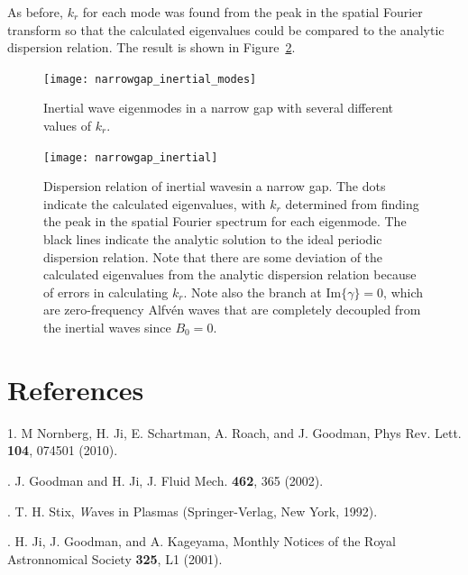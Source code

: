 \documentclass[letterpaper]{article}
\begin{document}
As before, $k_r$ for each mode was found from the peak in the spatial
Fourier transform so that the calculated eigenvalues could be compared
to the analytic dispersion relation. The result is shown in
Figure~\ref{fig:globalcode:narrowgap_inertial}.

\begin{figure}
\centering
\texttt{[image: narrowgap\_inertial\_modes]}
\caption[Inertial wave eigenmodes in a narrow gap]{Inertial wave
  eigenmodes in a narrow gap with several different values of
  $k_r$.}
\label{fig:globalcode:narrowgap_inertial_modes}
\end{figure}


\begin{figure}
\centering
\texttt{[image: narrowgap\_inertial]}
\caption[Dispersion relation of inertial wavesgap]{Dispersion relation
  of inertial wavesin a narrow gap. The dots indicate the calculated
  eigenvalues, with $k_r$ determined from finding the peak in the
  spatial Fourier spectrum for each eigenmode. The black lines
  indicate the analytic solution to the ideal periodic dispersion
  relation. Note that there are some deviation of the calculated
  eigenvalues from the analytic dispersion relation because of errors
  in calculating $k_r$. Note also the branch at
  $\mathrm{Im}\{\gamma\}=0$, which are zero-frequency Alfv\'en waves
  that are completely decoupled from the inertial waves since
  $B_0=0$.}
\label{fig:globalcode:narrowgap_inertial}
\end{figure}



\section{References}
1. M Nornberg, H. Ji, E. Schartman, A. Roach, and J. Goodman, Phys
Rev. Lett. {\bf 104}, 074501 (2010).

. J. Goodman and H. Ji, J. Fluid Mech. {\bf 462}, 365 (2002).

. T. H. Stix, {\emph Waves in Plasmas} (Springer-Verlag,
New York, 1992).

. H. Ji, J. Goodman, and A. Kageyama, Monthly Notices of the Royal Astronnomical Society {\bf 325}, L1 (2001).
\end{document}
